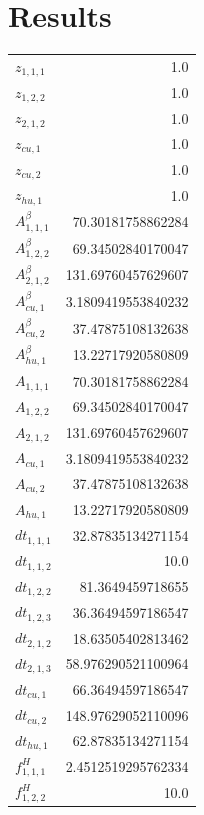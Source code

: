 \documentclass{article}%
\makeatletter
\let\mcnewpage=\newpage%
\newcommand{\TrickSupertabularIntoMulticols}{%
\renewcommand\newpage{%
\if@firstcolumn%
\hrule width\linewidth height0pt%
\columnbreak%
\else%
\mcnewpage%
\fi%
}%
}%
\makeatother
\begin{document}
\section{Results}%
\thispagestyle{plain}%
\begin{multicols*}{3}%
\TrickSupertabularIntoMulticols%
%
\begin{supertabular}{lr}%
	$z_{1,1,1}$ & 1.0 \\%
	$z_{1,2,2}$ & 1.0 \\%
	$z_{2,1,2}$ & 1.0 \\%
	$z_{cu,1}$ & 1.0 \\%
	$z_{cu,2}$ & 1.0 \\%
	$z_{hu,1}$ & 1.0 \\%
	$A_{1,1,1}^{\beta}$ & 70.30181758862284 \\%
	$A_{1,2,2}^{\beta}$ & 69.34502840170047 \\%
	$A_{2,1,2}^{\beta}$ & 131.69760457629607 \\%
	$A_{cu,1}^{\beta}$ & 3.1809419553840232 \\%
	$A_{cu,2}^{\beta}$ & 37.47875108132638 \\%
	$A_{hu,1}^{\beta}$ & 13.22717920580809 \\%
	$A_{1,1,1}$ & 70.30181758862284 \\%
	$A_{1,2,2}$ & 69.34502840170047 \\%
	$A_{2,1,2}$ & 131.69760457629607 \\%
	$A_{cu,1}$ & 3.1809419553840232 \\%
	$A_{cu,2}$ & 37.47875108132638 \\%
	$A_{hu,1}$ & 13.22717920580809 \\%
	$dt_{1,1,1}$ & 32.87835134271154 \\%
	$dt_{1,1,2}$ & 10.0 \\%
	$dt_{1,2,2}$ & 81.3649459718655 \\%
	$dt_{1,2,3}$ & 36.36494597186547 \\%
	$dt_{2,1,2}$ & 18.63505402813462 \\%
	$dt_{2,1,3}$ & 58.976290521100964 \\%
	$dt_{cu,1}$ & 66.36494597186547 \\%
	$dt_{cu,2}$ & 148.97629052110096 \\%
	$dt_{hu,1}$ & 62.87835134271154 \\%
	$f_{1,1,1}^{H}$ & 2.4512519295762334 \\%
	$f_{1,2,2}^{H}$ & 10.0 \\%

\end{supertabular}
\end{multicols*}
\end{document}
